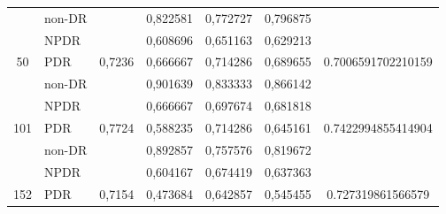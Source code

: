 \begin{table}[hbtp]
\begin{center}
\begin{tabular}{|c|l|c|l|l|l|c|}
			& non-DR                                             &                          & 0,822581                                          & 0,772727                                         & 0,796875                                        &                                      \\ \cline{2-2} \cline{4-6}
			& NPDR                                               &                          & 0,608696                                          & 0,651163                                         & 0,629213                                        &                                      \\ \cline{2-2} \cline{4-6}
			\multirow{-3}{*}{50}  & PDR                                                & \multirow{-3}{*}{0,7236} & 0,666667                                          & 0,714286                                         & 0,689655                                        & \multirow{-3}{*}{0.7006591702210159} \\ \hline
			& non-DR                                             &                          & 0,901639                                          & 0,833333                                         & 0,866142                                        &                                      \\ \cline{2-2} \cline{4-6}
			& NPDR                                               &                          & 0,666667                                          & 0,697674                                         & 0,681818                                        &                                      \\ \cline{2-2} \cline{4-6}
			\multirow{-3}{*}{101} & PDR                                                & \multirow{-3}{*}{0,7724} & 0,588235                                          & 0,714286                                         & 0,645161                                        & \multirow{-3}{*}{0.7422994855414904} \\ \hline
			& non-DR                                             &                          & 0,892857                                          & 0,757576                                         & 0,819672                                        &                                      \\ \cline{2-2} \cline{4-6}
			& NPDR                                               &                          & 0,604167                                          & 0,674419                                         & 0,637363                                        &                                      \\ \cline{2-2} \cline{4-6}
			\multirow{-3}{*}{152} & PDR                                                & \multirow{-3}{*}{0,7154} & 0,473684                                          & 0,642857                                         & 0,545455                                        & \multirow{-3}{*}{0.727319861566579}  \\ \hline
		\end{tabular}
	\end{center}
\end{table}

